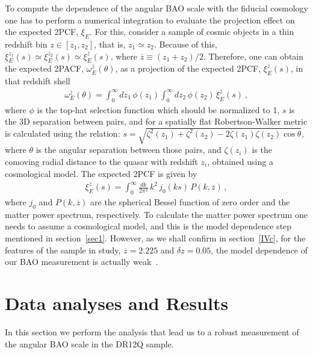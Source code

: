 \documentclass[a4paper,11pt]{article}
\begin{document}
To compute the dependence of the angular BAO scale with the fiducial cosmology one has to 
perform a numerical integration to evaluate the projection effect on the expected 2PCF, $\xi_E$. 
For this, consider a sample of cosmic objects in a thin redshift bin $z \in [z_1, z_2]$, that is, 
$z_1 \simeq z_2$. 
Because of this, $\xi_E^{z_1}(s) \simeq \xi_E^{z_2}(s) \simeq  \xi_E^{\bar{z}}(s)$, 
where $\overline{z} \equiv (z_{1}+z_{2})/2$. 
Therefore, one can obtain the expected 2PACF, $\omega_E^{\bar{z}}(\theta)$, as a projection of the 
expected 2PCF, $\xi_E^{\bar{z}}(s)$, in that redshift shell 
\begin{eqnarray}			    
\omega_E^{\bar{z}}(\theta)=\int_{0}^{\infty}dz_{1}\, \phi(z_{1})
\int_{0}^{\infty}dz_{2}\, \phi(z_{2})\, \xi_E^{\bar{z}}(s) \, ,
\label{eq4}
\end{eqnarray}
where $\phi$ is the top-hat selection function which should be normalized to 1, 
$s$ is the 3D separation between pairs, and for a spatially flat Robertson-Walker metric 
is calculated using the relation: 
$s = \sqrt{\zeta^2(z_1)+\zeta^2(z_2)-2\zeta(z_1)\zeta(z_2) \cos{\theta}}$, 
where $\theta$ is the angular separation between those pairs, and $\zeta(z_i)$ is the comoving radial 
distance to the quasar with redshift $z_i$, obtained using a cosmological model. 
The expected 2PCF is given by 
\begin{eqnarray}			    
\xi_E^{\bar{z}}(s)=\int_{0}^{\infty}\frac{dk}{2\pi^{2}}\,k^{2}\,j_{0}(ks)\,P(k,\overline{z}) \, ,
\end{eqnarray} 
where $j_{0}$ and $P(k,\overline{z})$ are the spherical Bessel function of zero order and the matter power 
spectrum, respectively. 
To calculate the matter power spectrum one needs to assume a cosmological model, and 
this is the model dependence step mentioned in section~\ref{sec1}. 
However, as we shall confirm in section~\ref{IVc}, for the features of the sample in study, 
$\overline{z} = 2.225$ and $\delta z = 0.05$, the model dependence of our BAO measurement is 
actually weak~\cite{Sanchez11}. 


\section{\label{sec4} Data analyses and Results} 

In this section we perform the analysis that lead us to a robust measurement of the angular BAO 
scale in the DR12Q sample. 
\end{document}
